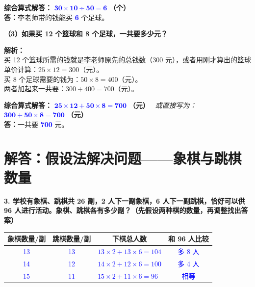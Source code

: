 \vspace{0.2cm}
\noindent\textbf{综合算式解答：} \textbf{\textcolor{blue}{$\boldsymbol{30 \times 10 \div 50 = 6}$}} \textbf{（个）} \\
\noindent\textbf{答：}李老师带的钱能买 \textbf{\textcolor{blue}{6}} 个足球。

\vspace{0.6cm}

\noindent\textbf{（3）如果买 12 个篮球和 8 个足球，一共要多少元？}

\vspace{0.2cm}

{\small\color{gray}
\textbf{解析：}\\
买 12 个篮球所需的钱就是李老师原先的总钱数（$300$ 元），或者用刚才算出的篮球单价计算：$25 \times 12 = 300$（元）。\\
买 8 个足球需要的钱为：$50 \times 8 = 400$（元）。\\
两者加起来一共要：$300 + 400 = 700$（元）。
}

\vspace{0.2cm}
\noindent\textbf{综合算式解答：} \textbf{\textcolor{blue}{$\boldsymbol{25 \times 12 + 50 \times 8 = 700}$}} \textbf{（元）} \ \textit{或直接写为：} \textbf{\textcolor{blue}{$\boldsymbol{300 + 50 \times 8 = 700}$}} \textbf{（元）}\\
\noindent\textbf{答：}一共要 \textbf{\textcolor{blue}{700}} 元。


\newpage



\newpage

\section{解答：假设法解决问题——象棋与跳棋数量}

\vspace{0.4cm}

\noindent\textbf{3. 学校有象棋、跳棋共 26 副，2 人下一副象棋，6 人下一副跳棋，恰好可以供 96 人进行活动。象棋、跳棋各有多少副？（先假设两种棋的数量，再调整找出答案）}

\vspace{0.8cm}

\begin{center}
\renewcommand{\arraystretch}{1.8}
\begin{tabular}{|c|c|l|c|}
\hline
\textbf{象棋数量/副} & \textbf{跳棋数量/副} & \multicolumn{1}{c|}{\textbf{下棋总人数}} & \textbf{和 96 人比较} \\ \hline
\textcolor{blue}{13} & \textcolor{blue}{13} & \textcolor{blue}{$13 \times 2 + 13 \times 6 = 104$} & \textcolor{blue}{多 8 人} \\ \hline
\textcolor{blue}{14} & \textcolor{blue}{12} & \textcolor{blue}{$14 \times 2 + 12 \times 6 = 100$} & \textcolor{blue}{多 4 人} \\ \hline
\textcolor{blue}{15} & \textcolor{blue}{11} & \textcolor{blue}{$15 \times 2 + 11 \times 6 = 96$} & \textcolor{blue}{相等} \\ \hline
\end{tabular}
\end{center}

